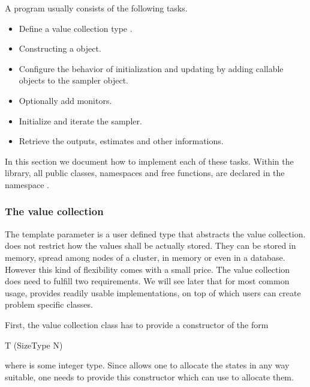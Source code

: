 A \vsmc program usually consists of the following tasks.
\begin{itemize}
  \item Define a value collection type .
  \item Constructing a  object.
  \item Configure the behavior of initialization and updating by adding
    callable objects to the sampler object.
  \item Optionally add monitors.
  \item Initialize and iterate the sampler.
  \item Retrieve the outputs, estimates and other informations.
\end{itemize}
In this section we document how to implement each of these tasks. Within the
\vsmc library, all public classes, namespaces and free functions, are declared
in the namespace .

\subsubsection{The value collection}

The template parameter  is a user defined type that abstracts the
value collection. \vsmc does not restrict how the values shall be actually
stored. They can be stored in memory, spread among nodes of a cluster, in \gpu
memory or even in a database. However this kind of flexibility comes with a
small price. The value collection does need to fulfill two requirements. We
will see later that for most common usage, \vsmc provides readily usable
implementations, on top of which users can create problem specific classes.

First, the value collection class  has to provide a constructor of the
form
\begin{cppcode}
T (SizeType N)
\end{cppcode}
where  is some integer type. Since \vsmc allows one to allocate
the states in any way suitable, one needs to provide this constructor which
 can use to allocate them.

